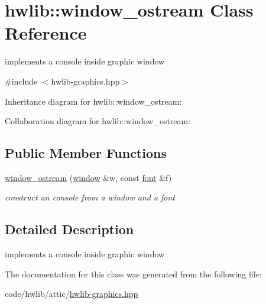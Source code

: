 \hypertarget{classhwlib_1_1window__ostream}{}\section{hwlib\+:\+:window\+\_\+ostream Class Reference}
\label{classhwlib_1_1window__ostream}


implements a console inside graphic window  




{\ttfamily \#include $<$hwlib-\/graphics.\+hpp$>$}



Inheritance diagram for hwlib\+:\+:window\+\_\+ostream\+:


Collaboration diagram for hwlib\+:\+:window\+\_\+ostream\+:
\subsection*{Public Member Functions}
\begin{DoxyCompactItemize}
\item 
\mbox{\label{classhwlib_1_1window__ostream_a6dd892c39405c76d0361dbe73dc256f8}} 
\hyperlink{classhwlib_1_1window__ostream_a6dd892c39405c76d0361dbe73dc256f8}{window\+\_\+ostream} (\hyperlink{classhwlib_1_1window}{window} \&w, const \hyperlink{classhwlib_1_1font}{font} \&f)
\begin{DoxyCompactList}\small\item\em construct an console from a window and a font \end{DoxyCompactList}\end{DoxyCompactItemize}


\subsection{Detailed Description}
implements a console inside graphic window 

The documentation for this class was generated from the following file\+:\begin{DoxyCompactItemize}
\item 
code/hwlib/attic/\hyperlink{hwlib-graphics_8hpp}{hwlib-\/graphics.\+hpp}\end{DoxyCompactItemize}

